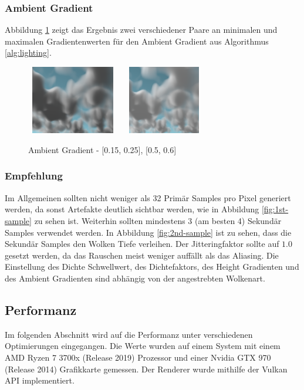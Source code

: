 \subsubsection{Ambient Gradient}
Abbildung \ref{fig:ambient-gradient} zeigt das Ergebnis zwei verschiedener Paare an minimalen und maximalen Gradientenwerten für den Ambient Gradient aus Algorithmus \ref{alg:lighting}.

\begin{figure}[H]
    \centering
    \includegraphics[width=4cm, height=3cm]{media/ag-low.png}
    \includegraphics[width=4cm, height=3cm]{media/ag-high.png}
    \caption{Ambient Gradient - [0.15, 0.25], [0.5, 0.6]}
    \label{fig:ambient-gradient}
\end{figure}

\subsubsection{Empfehlung}
Im Allgemeinen sollten nicht weniger als 32 Primär Samples pro Pixel generiert werden, da sonst Artefakte deutlich sichtbar werden, wie in Abbildung \ref{fig:1st-sample} zu sehen ist. Weiterhin sollten mindestens 3 (am besten 4) Sekundär Samples verwendet werden. In Abbildung \ref{fig:2nd-sample} ist zu sehen, dass die Sekundär Samples den Wolken Tiefe verleihen. Der Jitteringfaktor sollte auf $ 1.0 $ gesetzt werden, da das Rauschen meist weniger auffällt als das Aliasing. Die Einstellung des Dichte Schwellwert, des Dichtefaktors, des Height Gradienten und des Ambient Gradienten sind abhängig von der angestrebten Wolkenart.

\subsection{Performanz}
Im folgenden Abschnitt wird auf die Performanz unter verschiedenen Optimierungen eingegangen. Die Werte wurden auf einem System mit einem AMD Ryzen 7 3700x (Release 2019) Prozessor und einer Nvidia GTX 970 (Release 2014) Grafikkarte gemessen. Der Renderer wurde mithilfe der Vulkan API implementiert.

